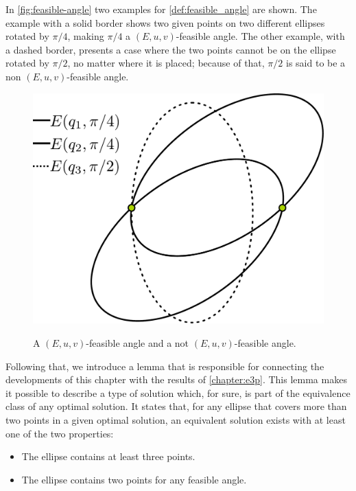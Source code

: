 In \autoref{fig:feasible-angle} two examples for \autoref{def:feasible_angle} are shown. The example with a solid border shows two given points on two different ellipses rotated by $\pi/4$, making $\pi/4$ a $(E, u, v)$-feasible angle.
The other example, with a dashed border, presents a case where the two points cannot be on the ellipse rotated by $\pi/2$, no matter where it is placed; because of that, $\pi/2$ is said to be a non $(E, u, v)$-feasible angle.

\begin{figure}[H]
	\centering
	\caption{A $(E, u, v)$-feasible angle and a not $(E, u, v)$-feasible angle.}
	\includegraphics[scale=.28]{tex/figures/feasible-angle2}
	\fautor
	\label{fig:feasible-angle}
\end{figure}

Following that, we introduce a lemma that is responsible for connecting the developments of this chapter with the results of \autoref{chapter:e3p}.
This lemma makes it possible to describe a type of solution which, for sure, is part of the equivalence class of any optimal solution.
It states that, for any ellipse that covers more than two points in a given optimal solution, an equivalent solution exists with at least one of the two properties:
\begin{itemize}
	\item The ellipse contains at least three points.
	\item The ellipse contains two points for any feasible angle.
\end{itemize}

